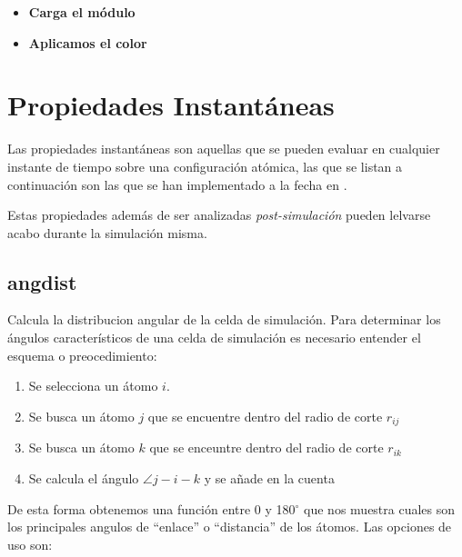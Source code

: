 \begin{itemize}
 \item \textbf{Carga el m\'odulo}
 \item \textbf{Aplicamos el color}
\end{itemize}


\section{Propiedades Instant\'aneas}
Las propiedades instant\'aneas son aquellas que se pueden evaluar en cualquier instante de tiempo sobre una configuraci\'on at\'omica, las que se listan a continuaci\'on son las que se han implementado a la fecha en {\lpmd}.

Estas propiedades adem\'as de ser analizadas \textit{post-simulaci\'on} pueden lelvarse acabo durante la simulaci\'on misma.

\subsection{angdist}
Calcula la distribucion angular de la celda de simulaci\'on. Para determinar los \'angulos caracter\'isticos de una celda de simulaci\'on es necesario entender el esquema o preocedimiento:
\begin{enumerate}
 \item Se selecciona un \'atomo $i$.
 \item Se busca un \'atomo $j$ que se encuentre dentro del radio de corte $r_{ij}$
 \item Se busca un \'atomo $k$ que se enceuntre dentro del radio de corte $r_{ik}$
 \item Se calcula el \'angulo  $\angle j-i-k$ y se a\~nade en la cuenta
\end{enumerate}

De esta forma obtenemos una funci\'on entre 0 y 180$^\circ$ que nos muestra cuales son los principales angulos de ``enlace'' o ``distancia'' de los \'atomos. Las opciones de uso son:


